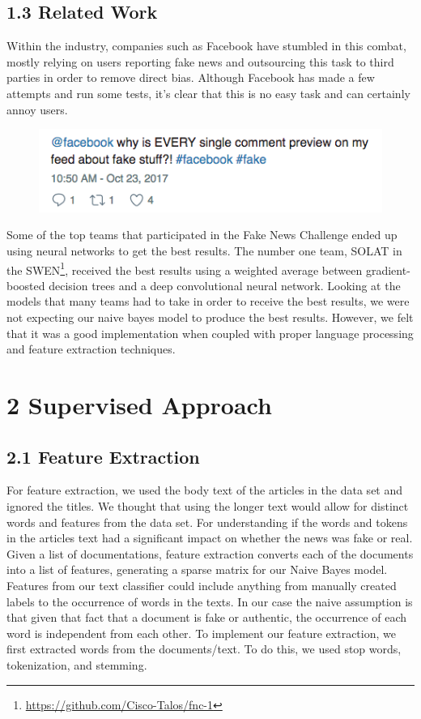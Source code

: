 \documentclass{neu_handout}
\begin{document}
\subsection*{1.3 Related Work}
Within the industry, companies such as Facebook have stumbled in this combat, mostly relying on users reporting fake news and outsourcing this task to third parties in order to remove direct bias. Although Facebook has made a few attempts and run some tests, it's clear that this is no easy task and can certainly annoy users.

\begin{figure}[h]
\centering
{
\includegraphics[width=0.3\linewidth]{fbfake}
}
\end{figure}

Some of the top teams that participated in the Fake News Challenge ended up using neural networks to get the best results. The number one team, SOLAT in the SWEN\footnote{\url{https://github.com/Cisco-Talos/fnc-1}}, received the best results using a weighted average between gradient-boosted decision trees and a deep convolutional neural network. Looking at the models that many teams had to take in order to receive the best results, we were not expecting our naive bayes model to produce the best results. However, we felt that it was a good implementation when coupled with proper language processing and feature extraction techniques.

\section*{2 Supervised Approach}

\subsection*{2.1 Feature Extraction}

For feature extraction, we used the body text of the articles in the data set and ignored the titles. We thought that using the longer text would allow for distinct words and features from the data set. For understanding if the words and tokens in the articles text had a significant impact on whether the news was fake or real.\\

Given a list of documentations, feature extraction converts each of the documents into a list of features, generating a sparse matrix for our Naive Bayes model. Features from our text classifier could include anything from manually created labels to the occurrence of words in the texts. In our case the naive assumption is that given that fact that a document is fake or authentic, the occurrence of each word is independent from each other. To implement our feature extraction, we first extracted words from the documents/text. To do this, we used stop words, tokenization, and stemming.\\
\end{document}

